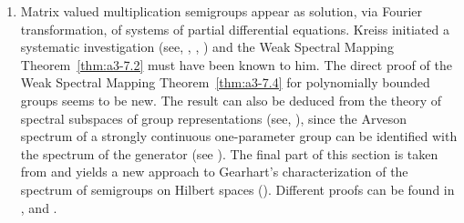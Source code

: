 \begin{enumerate}[label=\emph{Section \arabic*:}, wide, itemsep=1ex]
\item  
Matrix valued multiplication semigroups appear as solution, via Fourier transformation, of systems of partial differential equations.
Kreiss initiated a systematic investigation (see, \eg \citet{kreiss:1958}, \citet{kreiss:1959}, \citet{millerstrang:1966}) and the Weak Spectral Mapping Theorem~\ref{thm:a3-7.2} must have been known to him. 
The direct proof of the Weak Spectral Mapping Theorem~\ref{thm:a3-7.4} for polynomially bounded groups seems to be new. 
The result can also be deduced from the theory of spectral subspaces of group representations (see, \eg \citet{combesdelaroche:1978}), since the Arveson spectrum of a strongly continuous one-parameter group can be identified with the spectrum of the generator (see \citet{evans:1976}). 
The final part of this section is taken from \citet{greiner:1985} and yields a new approach to Gearhart's characterization of the spectrum of semigroups on Hilbert spaces (\citet{gearhart:1978}). 
Different proofs can be found in \citet{herbst:1983}, \citet{howland:1984} and \citet{pruess:1984}. 
\end{enumerate}

{\RaggedRight

}

